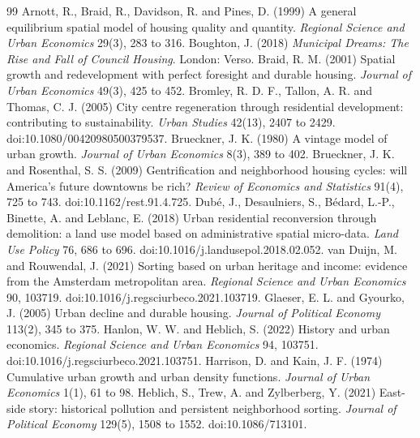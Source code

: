 \documentclass[11pt,a4paper]{article}
\begin{document}
\begin{thebibliography}{99}\small
{} Arnott, R., Braid, R., Davidson, R. and Pines, D. (1999) A general equilibrium spatial model of housing quality and quantity. \textit{Regional Science and Urban Economics} 29(3), 283 to 316.
 Boughton, J. (2018) \textit{Municipal Dreams: The Rise and Fall of Council Housing}. London: Verso.
 Braid, R. M. (2001) Spatial growth and redevelopment with perfect foresight and durable housing. \textit{Journal of Urban Economics} 49(3), 425 to 452.
 Bromley, R. D. F., Tallon, A. R. and Thomas, C. J. (2005) City centre regeneration through residential development: contributing to sustainability. \textit{Urban Studies} 42(13), 2407 to 2429. doi:10.1080/00420980500379537.
 Brueckner, J. K. (1980) A vintage model of urban growth. \textit{Journal of Urban Economics} 8(3), 389 to 402.
 Brueckner, J. K. and Rosenthal, S. S. (2009) Gentrification and neighborhood housing cycles: will America's future downtowns be rich? \textit{Review of Economics and Statistics} 91(4), 725 to 743. doi:10.1162/rest.91.4.725.
 Dub\'e, J., Desaulniers, S., B\'edard, L.-P., Binette, A. and Leblanc, E. (2018) Urban residential reconversion through demolition: a land use model based on administrative spatial micro-data. \textit{Land Use Policy} 76, 686 to 696. doi:10.1016/j.landusepol.2018.02.052.
 van Duijn, M. and Rouwendal, J. (2021) Sorting based on urban heritage and income: evidence from the Amsterdam metropolitan area. \textit{Regional Science and Urban Economics} 90, 103719. doi:10.1016/j.regsciurbeco.2021.103719.
 Glaeser, E. L. and Gyourko, J. (2005) Urban decline and durable housing. \textit{Journal of Political Economy} 113(2), 345 to 375.
 Hanlon, W. W. and Heblich, S. (2022) History and urban economics. \textit{Regional Science and Urban Economics} 94, 103751. doi:10.1016/j.regsciurbeco.2021.103751.
 Harrison, D. and Kain, J. F. (1974) Cumulative urban growth and urban density functions. \textit{Journal of Urban Economics} 1(1), 61 to 98.
 Heblich, S., Trew, A. and Zylberberg, Y. (2021) East-side story: historical pollution and persistent neighborhood sorting. \textit{Journal of Political Economy} 129(5), 1508 to 1552. doi:10.1086/713101.

\end{thebibliography}
\end{document}
